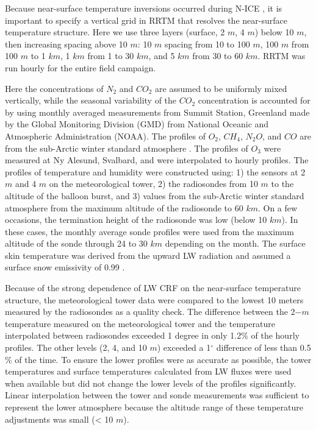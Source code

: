 Because near-surface temperature inversions occurred during N-ICE \citep{kayser:2017}, it is important to specify a vertical grid in RRTM that resolves the near-surface temperature structure. Here we use three layers (surface, 2 $m$, 4 $m$) below 10 $m$, then increasing spacing above 10 $m$: 10 $m$ spacing from 10 to 100 $m$, 100 $m$ from 100 $m$ to 1 $km$, 1 $km$ from 1 to 30 $km$, and 5 $km$ from 30 to 60 $km$. RRTM was run hourly for the entire field campaign.

Here the concentrations of $N_{2}$ and $CO_{2}$ are assumed to be uniformly mixed vertically, while the seasonal variability of the $CO_{2}$ concentration is accounted for by using monthly averaged measurements from Summit Station, Greenland made by the Global Monitoring Division (GMD) from National Oceanic and Atmospheric Administration (NOAA). The profiles of $O_{2}$, $CH_{4}$, $N_{2}O$, and $CO$ are from the sub-Arctic winter standard atmosphere \citep{mcclatchey:1972}. The profiles of $O_{3}$ were measured at Ny Alesund, Svalbard, and were interpolated to hourly profiles. The profiles of temperature and humidity were constructed using: 1) the sensors at 2 $m$ and 4 $m$ on the meteorological tower, 2) the radiosondes from 10 $m$ to the altitude of the balloon burst, and 3) values from the sub-Arctic winter standard atmosphere from the maximum altitude of the radiosonde to 60 $km$. On a few occasions, the termination height of the radiosonde was low (below 10 $km$). In these cases, the monthly average sonde profiles were used from the maximum altitude of the sonde through 24 to 30 $km$ depending on the month. The surface skin temperature was derived from the upward LW radiation \citep{walden:2017} and assumed a surface snow emissivity of 0.99 \citep{persson:2002, grenfell:1999}.

Because of the strong dependence of LW CRF on the near-surface temperature structure, the meteorological tower data were compared to the lowest 10 meters measured by the radiosondes as a quality check. The difference between the 2$-m$ temperature measured on the meteorological tower and the temperature interpolated between radiosondes exceeded 1 degree in only 1.2$\%$ of the hourly profiles. The other levels (2, 4, and 10 $m$) exceeded a 1$^{\circ}$ difference of less than 0.5$\%$ of the time. To ensure the lower profiles were as accurate as possible, the tower temperatures and surface temperatures calculated from LW fluxes were used when available but did not change the lower levels of the profiles significantly. Linear interpolation between the tower and sonde measurements was sufficient to represent the lower atmosphere because the altitude range of these temperature adjustments was small (< 10 $m$).

